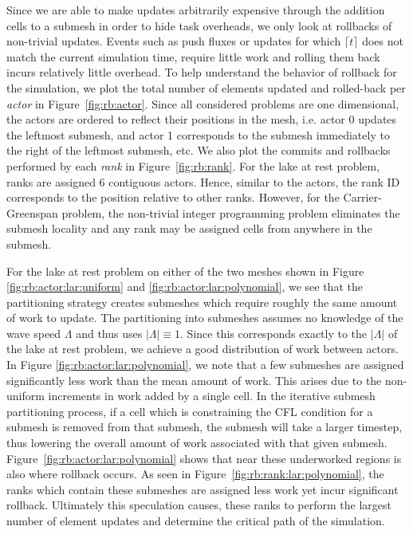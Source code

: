 \documentclass[10pt,letterpaper]{article}
\begin{document}
Since we are able to make updates arbitrarily expensive through the addition cells to a submesh in order to hide task overheads, we only look at rollbacks of non-trivial updates. Events such as push fluxes or updates for which $\lceil t \rceil$ does not match the current simulation time, require little work and rolling them back incurs relatively little overhead.
To help understand the behavior of rollback for the simulation, we plot the total number of elements updated and rolled-back per {\em actor} in Figure~\ref{fig:rb:actor}. Since all considered problems are one dimensional, the actors are ordered to reflect their positions in the mesh, i.e. actor 0 updates the leftmost submesh, and actor 1 corresponds to the submesh immediately to the right of the leftmost submesh, etc.
We also plot the commits and rollbacks performed by each {\em rank} in Figure~\ref{fig:rb:rank}. For the lake at rest problem, ranks are assigned 6 contiguous actors. Hence, similar to the actors, the rank ID corresponds to the position relative to other ranks. However, for the Carrier-Greenspan problem, the non-trivial integer programming problem eliminates the submesh locality and any rank may be assigned cells from anywhere in the submesh.


 For the lake at rest problem on either of the two meshes shown in Figure \ref{fig:rb:actor:lar:uniform} and \ref{fig:rb:actor:lar:polynomial}, we see that the partitioning strategy creates submeshes which require roughly the same amount of work to update. The partitioning into submeshes assumes no knowledge of the wave speed $\Lambda$ and thus uses $|\Lambda|\equiv 1$. Since this corresponds exactly to the $|\Lambda|$ of the lake at rest problem, we achieve a good distribution of work between actors. In Figure \ref{fig:rb:actor:lar:polynomial}, we note that a few submeshes are assigned significantly less work than the mean amount of work. This arises due to the non-uniform increments in work added by a single cell. In the iterative submesh partitioning process, if a cell which is constraining the CFL condition for a submesh is removed from that submesh, the submesh will take a larger timestep, thus lowering the overall amount of work associated with that given submesh. Figure~\ref{fig:rb:actor:lar:polynomial} shows that near these underworked regions is also where rollback occurs. As seen in Figure~\ref{fig:rb:rank:lar:polynomial}, the ranks which contain these submeshes are assigned less work yet incur significant rollback. Ultimately this speculation causes, these ranks to perform the largest number of element updates and determine the critical path of the simulation.
 
\end{document}
